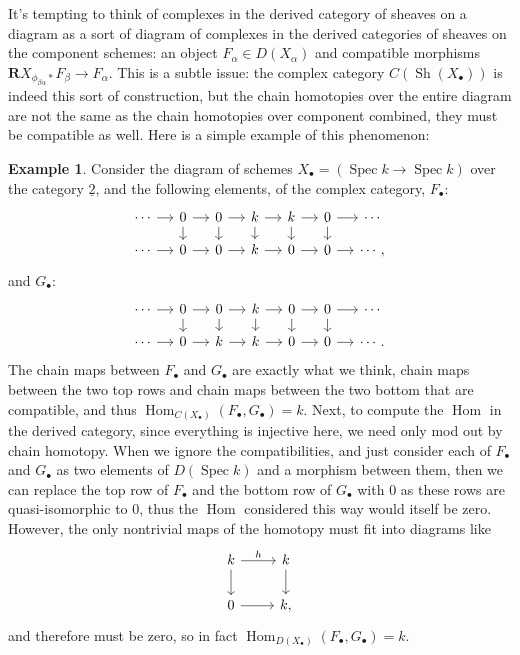 \documentclass{report}
\theoremstyle{definition}
\newtheorem{example}[theorem]{Example}
\DeclareMathOperator{\Hom}{Hom}
\DeclareMathOperator{\Sh}{Sh}
\DeclareMathOperator{\Spec}{Spec}
\newcommand{\bR}{\textbf{R}}
\newcommand{\tu}{\underline{2}}
\begin{document}
It's tempting to think of complexes in the derived category of sheaves on a diagram as a sort of diagram of complexes in the derived categories of sheaves on the component schemes: an object $F_\alpha \in D(X_\alpha)$ and compatible morphisms $\bR X_{\phi_{\beta \alpha} *} F_\beta \rightarrow F_\alpha$.
This is a subtle issue: the complex category $C(\Sh(X_\bullet))$ is indeed this sort of construction, but the chain homotopies over the entire diagram are not the same as the chain homotopies over component combined, they must be compatible as well.
Here is a simple example of this phenomenon:
\begin{example}
	\label{ex:ddiagvsdiagd}
	Consider the diagram of schemes $X_\bullet = (\Spec k \rightarrow \Spec k)$ over the category $\tu$, and the following elements, of the complex category, $F_\bullet$:
	\[
		\begin{tikzcd}[column sep = small, row sep = small]
			\cdots \ar[r] & 0 \ar[r] \ar[d] & 0 \ar[r] \ar[d] & k \ar{r} \ar{d} & k \ar[r] \ar[d] & 0 \ar[r] \ar[d] & \cdots \\
			\cdots \ar[r] & 0 \ar[r] & 0 \ar[r] & k \ar[r] & 0 \ar[r] & 0 \ar[r] & \cdots,
		\end{tikzcd}
	\]
	and $G_\bullet$:
	\[
		\begin{tikzcd}[column sep = small, row sep = small]
			\cdots \ar[r] & 0 \ar[r] \ar[d] & 0 \ar[r] \ar[d] & k \ar[r] \ar[d] & 0 \ar[r] \ar[d] & 0 \ar[r] \ar[d] & \cdots \\
			\cdots \ar[r] & 0 \ar[r] & k \ar[r] & k \ar[r] & 0 \ar[r] & 0 \ar[r] & \cdots.
		\end{tikzcd}
	\]
	The chain maps between $F_\bullet$ and $G_\bullet$ are exactly what we think, chain maps between the two top rows and chain maps between the two bottom that are compatible, and thus $\Hom_{C(X_\bullet)}(F_\bullet, G_\bullet) = k$.
	Next, to compute the $\Hom$ in the derived category, since everything is injective here, we need only mod out by chain homotopy.
	When we ignore the compatibilities, and just consider each of $F_\bullet$ and $G_\bullet$ as two elements of $D(\Spec k)$ and a morphism between them, then we can replace the top row of $F_\bullet$ and the bottom row of $G_\bullet$ with 0 as these rows are quasi-isomorphic to 0, thus the $\Hom$ considered this way would itself be zero.
	However, the only nontrivial maps of the homotopy must fit into diagrams like
	\[
		\begin{tikzcd}
			k \arrow{r}{h} \ar[d] & k \ar[d] \\
			0 \ar[r] & k,
		\end{tikzcd}
	\]
	and therefore must be zero, so in fact $\Hom_{D(X_\bullet)}(F_\bullet, G_\bullet) = k$.
	

\end{example}
\end{document}
